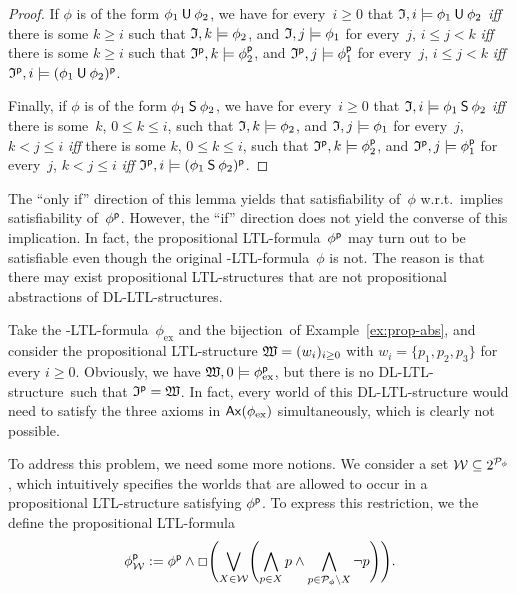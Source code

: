 \begin{proof}
    If $\phi$ is of the form $\phi_1\mathbin{\mathsf{U}}\phi_2$, we have for every~$i\ge 0$
    that $\mathfrak{I},i\models\phi_1\mathbin{\mathsf{U}}\phi_2$ \emph{iff} there is some $k\ge i$
    such that $\mathfrak{I},k\models\phi_2$, and $\mathfrak{I},j\models\phi_1$ for every~$j$,
    $i\le j<k$ \emph{iff} there is some $k\ge i$ such that
    $\mathfrak{I}^\mathsf{p},k\models\phi_2^\mathsf{p}$, and $\mathfrak{I}^\mathsf{p},j\models\phi_1^\mathsf{p}$
    for every~$j$, $i\le j<k$ \emph{iff}
    $\mathfrak{I}^\mathsf{p},i\models(\phi_1\mathbin{\mathsf{U}}\phi_2)^\mathsf{p}$.

    Finally, if $\phi$ is of the form $\phi_1\mathbin{\mathsf{S}}\phi_2$, we have for
    every~$i\ge 0$ that $\mathfrak{I},i\models\phi_1\mathbin{\mathsf{S}}\phi_2$ \emph{iff} there is
    some~$k$, $0\le k\le i$, such that $\mathfrak{I},k\models\phi_2$, and
    $\mathfrak{I},j\models\phi_1$ for every~$j$, $k<j\le i$ \emph{iff} there is some
    $k$, $0\le k\le i$, such that $\mathfrak{I}^\mathsf{p},k\models\phi_2^\mathsf{p}$, and
    $\mathfrak{I}^\mathsf{p},j\models\phi_1^\mathsf{p}$ for every~$j$, $k<j\le i$ \emph{iff}
    $\mathfrak{I}^\mathsf{p},i\models(\phi_1\mathbin{\mathsf{S}}\phi_2)^\mathsf{p}$.
\end{proof}

\noindent
The \enquote{only if} direction of this lemma yields that satisfiability
of~$\phi$ w.r.t.~\Rmc implies satisfiability of~$\phi^\mathsf{p}$.  However, the
\enquote{if} direction does not yield the converse of this implication.  In
fact, the propositional LTL-formula~$\phi^\mathsf{p}$ may turn out to be satisfiable
even though the original \SHOQ-LTL-formula~$\phi$ is not.  The reason is that
there may exist propositional LTL-structures that are not propositional
abstractions of DL-LTL-structures.

\begin{example}
    Take the \SHOQ-LTL-formula~$\phi_\text{ex}$ and the bijection~\psf of
    Example~\ref{ex:prop-abs}, and consider the propositional LTL-structure
    $\mathfrak{W}=(w_i)_{i\ge 0}$ with $w_i=\{p_1,p_2,p_3\}$ for every $i\ge 0$.
    Obviously, we have $\mathfrak{W},0\models\phi_\text{ex}^\mathsf{p}$, but there is no
    DL-LTL-structure~\Imf such that $\mathfrak{I}^\mathsf{p}=\mathfrak{W}$.  In fact, every world of
    this DL-LTL-structure would need to satisfy the three axioms in
    $\operatorname{\mathsf{Ax}}(\phi_\text{ex})$ simultaneously, which is clearly not possible.
\end{example}

\noindent
To address this problem, we need some more notions.  We consider a set
$\mathcal{W}\subseteq 2^{\mathcal{P}_\phi}$, which intuitively specifies the worlds that are
allowed to occur in a propositional LTL-structure satisfying $\phi^\mathsf{p}$.  To
express this restriction, we the define the propositional LTL-formula
\[\phi^\psf_\Wmc:=\phi^\psf\land%
    \Box\Biggl(\bigvee_{X\in\Wmc}\Biggl(\bigwedge_{p\in X}p\land%
    \bigwedge_{p\in\Pmc_\phi\setminus X}\lnot p\Biggr)\Biggr).\]


